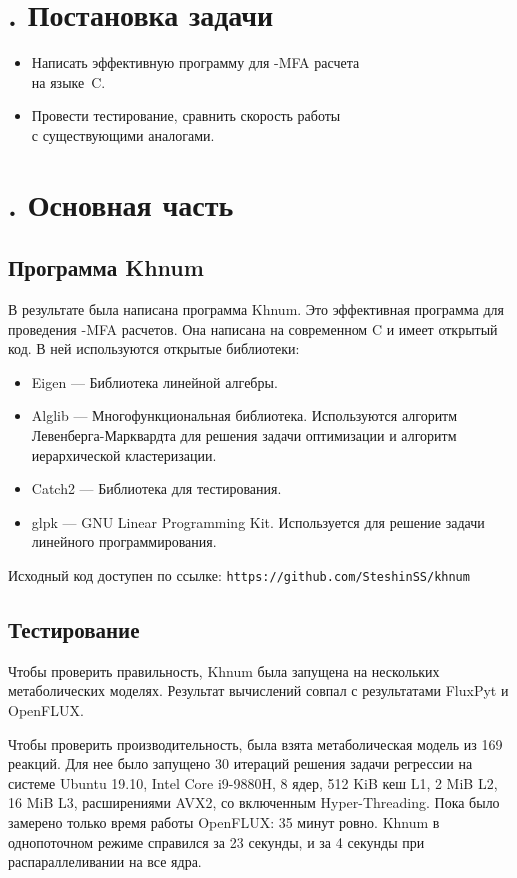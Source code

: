 \documentclass[14pt, a4paper]{extreport}
\newcommand{\CC}{C\nolinebreak\hspace{-.05em}\raisebox{.4ex}{\tiny\bf +}\nolinebreak\hspace{-.10em}\raisebox{.4ex}{\tiny\bf +}}
\def\CC{{C\nolinebreak[4]\hspace{-.05em}\raisebox{.4ex}{\tiny\bf ++}}} %
\begin{document}
\chapter[Постановка задачи]{\thechapter{}. Постановка задачи}
\begin{itemize}
	\item Написать эффективную программу для -MFA расчета \\на языке~\CC.
	\item Провести тестирование, сравнить скорость работы\\с существующими аналогами.
\end{itemize}

\chapter[Основная часть]{\thechapter{}. Основная часть}
\section{Программа Khnum}
В результате была написана программа Khnum. Это эффективная программа для проведения -MFA расчетов. Она написана на современном \CC{} и имеет открытый код. В ней используются открытые библиотеки:
\begin{itemize}
	\item Eigen --- Библиотека линейной алгебры.
	\item Alglib --- Многофункциональная библиотека. Используются алгоритм Левенберга-Марквардта для решения задачи оптимизации и алгоритм иерархической кластеризации.
	\item Catch2 --- Библиотека для тестирования.
	\item glpk --- GNU Linear Programming Kit. Используется для решение задачи линейного программирования.
\end{itemize}
Исходный код доступен по ссылке: \texttt{https://github.com/SteshinSS/khnum}

\section{Тестирование}
Чтобы проверить правильность, Khnum была запущена на нескольких метаболических моделях. Результат вычислений совпал с результатами FluxPyt и OpenFLUX.

Чтобы проверить производительность, была взята метаболическая модель из 169 реакций. Для нее было запущено 30 итераций решения задачи регрессии на системе Ubuntu 19.10, Intel Core i9-9880H, 8 ядер, 512 KiB кеш L1, 2 MiB L2, 16 MiB L3, расширениями AVX2, со включенным Hyper-Threading. Пока было замерено только время работы OpenFLUX: 35 минут ровно. Khnum в однопоточном режиме справился за 23 секунды, и за 4 секунды при распараллеливании на все ядра.
\end{document}
